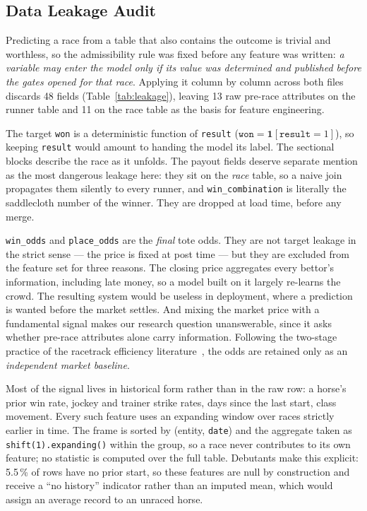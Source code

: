 \subsection{Data Leakage Audit}
\label{sec:leakage}

Predicting a race from a table that also contains the outcome is trivial
and worthless, so the admissibility rule was fixed before any feature was
written: \emph{a variable may enter the model only if its value was
determined and published before the gates opened for that race}. Applying
it column by column across both files discards 48 fields
(Table~\ref{tab:leakage}), leaving 13 raw pre-race attributes on the
runner table and 11 on the race table as the basis for feature
engineering.

The target \texttt{won} is a deterministic function of \texttt{result}
($\texttt{won}=\mathbf{1}[\texttt{result}=1]$), so keeping \texttt{result}
would amount to handing the model its label. The sectional blocks describe
the race as it unfolds. The payout fields deserve separate mention as the
most dangerous leakage here: they sit on the \emph{race} table, so a naive
join propagates them silently to every runner, and
\texttt{win\_combination} is literally the saddlecloth number of the
winner. They are dropped at load time, before any merge.

\texttt{win\_odds} and \texttt{place\_odds} are the \emph{final} tote
odds. They are not target leakage in the strict sense --- the price is
fixed at post time --- but they are excluded from the feature set for
three reasons. The closing price aggregates every bettor's information,
including late money, so a model built on it largely re-learns the crowd.
The resulting system would be useless in deployment, where a prediction is
wanted before the market settles. And mixing the market price with a
fundamental signal makes our research question unanswerable, since it asks
whether pre-race attributes alone carry information. Following the
two-stage practice of the racetrack efficiency
literature~\cite{ejeA_benter2008}, the odds are retained only as an
\emph{independent market baseline}.

Most of the signal lives in historical form rather than in the raw row: a
horse's prior win rate, jockey and trainer strike rates, days since the
last start, class movement. Every such feature uses an expanding window
over races strictly earlier in time. The frame is sorted by (entity,
\texttt{date}) and the aggregate taken as \texttt{shift(1).expanding()}
within the group, so a race never contributes to its own feature; no
statistic is computed over the full table. Debutants make this explicit:
5.5\,\% of rows have no prior start, so these features are null by
construction and receive a ``no history'' indicator rather than an imputed
mean, which would assign an average record to an unraced horse.

